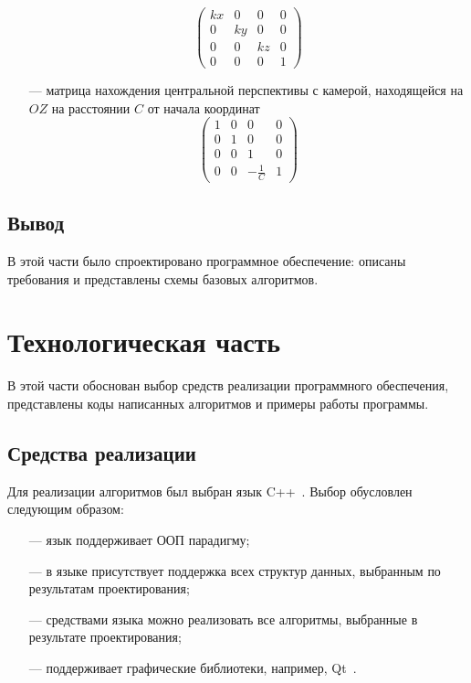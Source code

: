 \documentclass[a4paper, 14pt]{extreport}
\begin{document}
\begin{itemize}
		\begin{equation}
			\begin{pmatrix}
				kx  & 0   & 0   & 0 \\
				0   & ky  & 0   & 0 \\
				0   & 0   & kz  & 0 \\
				0   & 0   & 0   & 1
			\end{pmatrix}
		\end{equation}
	\item[---] матрица нахождения центральной перспективы с камерой, находящейся на $OZ$ на расстоянии $C$ от начала 
	координат
			\begin{equation}
			\begin{pmatrix}
				1   & 0  & 0  		& 0 \\
				0   & 1  &  0  		& 0 \\
				0   & 0  & 1                    & 0 \\
				0   & 0  & -\frac{1}{C}     & 1
			\end{pmatrix}
		\end{equation}
\end{itemize}

\section{Вывод}

В этой части было спроектировано программное обеспечение: описаны требования и представлены схемы базовых 
алгоритмов.

\chapter{Технологическая часть}

В этой части обоснован выбор средств реализации программного обеспечения, представлены коды написанных
алгоритмов и примеры работы программы.

\section{Средства реализации}

Для реализации алгоритмов был выбран язык C++~\cite{c++}. Выбор обусловлен следующим образом:
\begin{itemize}
	\item[---] язык поддерживает ООП парадигму;
	\item[---] в языке присутствует поддержка всех структур данных, выбранным по результатам проектирования;
	\item[---] средствами языка можно реализовать все алгоритмы, выбранные в результате проектирования;
	\item[---] поддерживает графические библиотеки, например, Qt~\cite{qt}.
\end{itemize}
\end{document}
